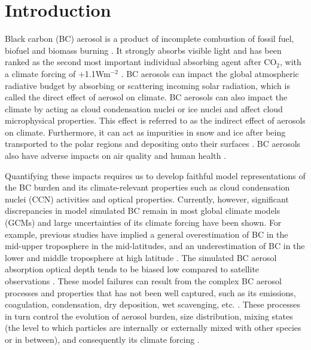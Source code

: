 \documentclass[12pt, fullpage]{uiucthesis2009}
\begin{document}
\chapter{Introduction}
	Black carbon (BC) aerosol is a product of incomplete combustion of fossil fuel, biofuel and biomass burning \citep[e.g.][]{Bond2004,forsstrom2013}. It strongly absorbs visible light and has been ranked as the second most important individual absorbing agent after CO$_{2}$, with a climate forcing of +1.1Wm$^{-2}$ \citep{Bond2013}. BC aerosols can impact the global atmospheric radiative budget by absorbing or scattering incoming solar radiation, which is called the direct effect of aerosol on climate. BC aerosols can also impact the climate by acting as cloud condensation nuclei or ice nuclei and affect cloud microphysical properties. This effect is referred to as the indirect effect of aerosols on climate. Furthermore, it can act as impurities in snow and ice after being transported to the polar regions and depositing onto their surfaces \citep[e.g.][]{zuberi2005hydrophilic,flanner2007present}. BC aerosols also have adverse impacts on air quality and human health \citep{highwood2006smoke}.
	
	Quantifying these impacts requires us to develop faithful model representations of the BC burden and its climate-relevant properties such as cloud condensation nuclei (CCN) activities and optical properties. Currently, however, significant discrepancies in model simulated BC remain in most global climate models (GCMs) and large uncertainties of its climate forcing have been shown. For example, previous studies have implied a general overestimation of BC in the mid-upper troposphere in the mid-latitudes, and an underestimation of BC in the lower and middle troposphere at high latitude \citep[e.g.][]{koch2009evaluation,schwarz2010global,fan2012easy}. The simulated BC aerosol absorption optical depth tends to be biased low compared to satellite observations \citep[e.g.][]{koch2009evaluation}. These model failures can result from the complex BC aerosol processes and properties that has not been well captured, such as its emissions, coagulation, condensation, dry deposition, wet scavenging, etc. \citep[][]{hakami2005adjoint,koch2009evaluation,shindell2012simultaneously}. These processes in turn control the evolution of aerosol burden, size distribution, mixing states (the level to which particles are internally or externally mixed with other species or in between), and consequently its climate forcing \citep[e.g.][]{schulz2006radiative}. 
	
\end{document}
